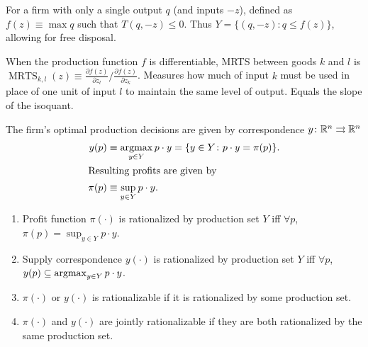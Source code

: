 \documentclass[8pt,letterpaper, landscape]{extarticle} %
\begin{document}
\begin{multicols}{3}
\begin{description}
 For a firm with only a single output $ q $ (and inputs $ -z $), defined as $ f(z) \equiv \max q $ such that $ T(q, -z) \leq 0 $. Thus $ Y = \{ (q, -z) \colon q \leq f(z) \} $, allowing for free disposal.

 When the production function $ f $ is differentiable, MRTS between goods $ k $ and $ l $ is $ \operatorname{MRTS}_{k,l}(z) \equiv \frac{\partial f(z)}{\partial z_l} / \frac{\partial f(z)}{\partial z_k} $. Measures how much of input $ k $ must be used in place of one unit of input $ l $ to maintain the same level of output. Equals the slope of the isoquant.

 The firm's optimal production decisions are given by correspondence $ y \colon \mathbb{R}^n \rightrightarrows \mathbb{R}^n $
\begin{align*}
y (p) &\equiv \operatorname*{argmax}_{y \in Y} p \cdot y = \{ y \in Y \colon p \cdot y = \pi(p) \}. \\
\intertext{Resulting profits are given by}
\pi(p) &\equiv \sup_{y \in Y} p \cdot y.
\end{align*}

\begin{enumerate}
\item Profit function $ \pi (\cdot) $ is rationalized by production set $ Y $ iff $ \forall p $, $ \pi(p) = \sup_{y \in Y} p \cdot y $.
\item Supply correspondence $ y (\cdot) $ is rationalized by production set $ Y $ iff $ \forall p $, $ y(p) \subseteq \operatorname*{argmax}_{y \in Y} p \cdot y $.
\item $ \pi (\cdot) $ or $ y (\cdot) $ is rationalizable if it is rationalized by some production set.
\item $ \pi (\cdot) $ and $ y (\cdot) $ are jointly rationalizable if they are both rationalized by the same production set.
\end{enumerate}


\end{description}
\end{multicols}
\end{document}
